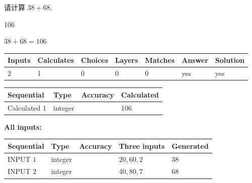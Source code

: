 \documentclass{ctexart}
\begin{document}
  
 
请计算 $ %
38 +  %
68 $.
 
 
 
\noindent{}
 
 

106
 
 
\noindent{}
 
 

 
 
 
\noindent{}
 
 

$ %
38 +  %
68=   %
106$
 
 
\noindent{}
 
 

 
   
   
   
   
\noindent\begin{tabular}{|l|l|l|l|l|l|l|}
 \hline
Inputs & Calculates & Choices & Layers & Matches & Answer & Solution \\ \hline
 2  & 
 1  & 
 0
  & 
 0  & 
 0  & 
  yes & 
  yes 
  \\ \hline
 \end{tabular}
   
   
   
   
\noindent{}
   
   
  
  
\noindent\begin{tabular}{|l|l|l|l|}
\hline
 Sequential & Type & Accuracy & Calculated \\ 
\hline
 
 
  Calculated $  1 $ & integer &  & 
  $ 106 $ 
 \\  \hline  
 \end{tabular}
   
   
   
   
\noindent\vspace{0.1in}\hspace{-0.08in} {\textbf{\Large{All inputs: }}}
   
   
  
  
\noindent\begin{tabular}{|l|l|l|l|l|}
\hline
 Sequential & Type & Accuracy & Three inputs & Generated \\ 
\hline
 
 
  INPUT $  1 $ & integer &  & $
 20
 , 
 60
 , 
 2
 $ & $ 38 $ 
 \\  \hline  
 
 
  INPUT $  2 $ & integer &  & $
 40
 , 
 80
 , 
 7
 $ & $ 68 $ 
 \\  \hline  
 \end{tabular}
   
\end{document}
